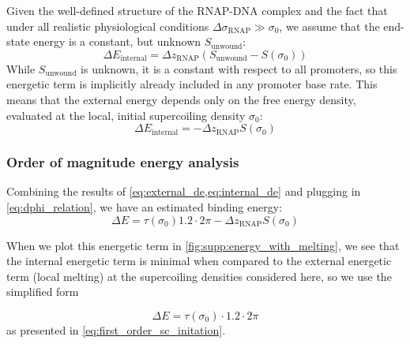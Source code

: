 \documentclass[11pt]{article}
\begin{document}
Given the well-defined structure of the RNAP-DNA complex and the fact that under all realistic physiological conditions \(\Delta \sigma_\text{RNAP} \gg \sigma_0\), we assume that the end-state energy is a constant, but unknown \(S_\text{unwound}\):
\begin{equation}
    \Delta E_\text{internal} = \Delta z_\text{RNAP} \left(S_\text{unwound} - S(\sigma_0)\right)
\end{equation}
While \(S_\text{unwound}\) is unknown, it is a constant with respect to all promoters, so this energetic term is implicitly already included in any promoter base rate. This means that the external energy depends only on the free energy density, evaluated at the local, initial supercoiling density \(\sigma_0\):
\begin{equation}
    \Delta E_\text{internal} = -\Delta z_\text{RNAP} S(\sigma_0) \label{eq:internal_de}
\end{equation}

\subsubsection{Order of magnitude energy analysis}
Combining the results of \cref{eq:external_de,eq:internal_de} and plugging in \cref{eq:dphi_relation}, we have an estimated binding energy:
\begin{equation}
    \Delta E = \tau(\sigma_0) 1.2 \cdot 2\pi - \Delta z_\text{RNAP} S(\sigma_0)
\end{equation}

When we plot this energetic term in \cref{fig:supp:energy_with_melting}, we see that the internal energetic term is minimal when compared to the external energetic term (local melting) at the supercoiling densities considered here, so we use the simplified form

\begin{equation}
    \Delta E = \tau(\sigma_0) \cdot 1.2 \cdot 2\pi
\end{equation}
as presented in \cref{eq:first_order_sc_initation}.
\end{document}
